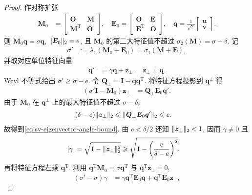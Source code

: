 \documentclass{ctexart}
\newcommand{\q}{\quad}
\newcommand{\T}{\mathrm{T}}
\newcommand{\dt}{\delta}
\renewcommand{\ge}{\geqslant}
\renewcommand{\le}{\leqslant}
\DeclarePairedDelimiter\norm{\lVert}{\rVert}
\DeclarePairedDelimiter\abs{\lvert}{\rvert}
\begin{document}
\begin{proof}
作对称扩张
\begin{align}
    \bm M_0&=
    \begin{bmatrix}\mathbf O&\bm M\\\bm M^\T&\mathbf O\end{bmatrix},\q
    \bm E_0=
    \begin{bmatrix}\mathbf O&\bm E\\\bm E^\T&\mathbf O\end{bmatrix},\q
    \bm q=\frac1{\sqrt2}
    \begin{bmatrix}\bm u\\\bm v\end{bmatrix}.
    \label{eq:sv-symmetric-dilation}
\end{align}
则 $\bm M_0\bm q=\sigma\bm q$, $\norm{\bm E_0}_2=e$, 且 $\bm M_0$ 的第二大特征值不超过 $\sigma_2(\bm M)=\sigma-\dt$. 记
\begin{align}
    \sigma'&:=\lambda_1(\bm M_0+\bm E_0)=\sigma_1(\bm M+\bm E),
    \label{eq:sv-dilation-top-eigenvalue}
\end{align}
并取对应单位特征向量
\begin{align}
    \bm q'&=\gamma\bm q+\bm z_\perp,\q \bm z_\perp\perp\bm q.
    \label{eq:sv-eigenvector-decomposition}
\end{align}
Weyl 不等式给出 $\sigma'\ge\sigma-e$. 令 $\bm Q_\perp=\bm I-\bm q\bm q^\T$. 将特征方程投影到 $\bm q^\perp$ 得
\begin{align}
    (\sigma'\bm I-\bm M_0)\bm z_\perp
    &=\bm Q_\perp\bm E_0\bm q'.
    \label{eq:sv-projected-eigen-equation}
\end{align}
由于 $\bm M_0$ 在 $\bm q^\perp$ 上的最大特征值不超过 $\sigma-\dt$,
\begin{align}
    (\dt-e)\norm{\bm z_\perp}_2
    &\le \norm{\bm Q_\perp\bm E_0\bm q'}_2
     \le e.
    \label{eq:sv-angle-proof-bound}
\end{align}
故得到\cref{eq:sv-eigenvector-angle-bound}. 由 $e<\dt/2$ 还知
$\norm{\bm z_\perp}_2<1$, 因而 $\gamma\ne0$ 且
\begin{align}
    \abs\gamma
    &=\sqrt{1-\norm{\bm z_\perp}_2^2}
     \ge
     \sqrt{1-\left(\frac{e}{\dt-e}\right)^2}.
    \label{eq:sv-gamma-lower}
\end{align}
再将特征方程左乘 $\bm q^\T$. 利用 $\bm q^\T\bm M_0=\sigma\bm q^\T$ 与 $\bm q^\T\bm z_\perp=0$,
\begin{align}
    (\sigma'-\sigma)\gamma
    &=\gamma\bm q^\T\bm E_0\bm q
      +\bm q^\T\bm E_0\bm z_\perp,
    \label{eq:sv-top-eigenvalue-projection}

\end{align}
\end{proof}
\end{document}
